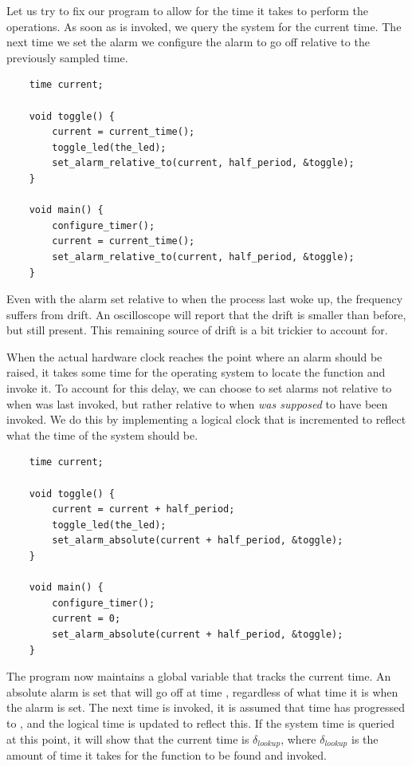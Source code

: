 Let us try to fix our program to allow for the time it takes to perform the operations.
As soon as  is invoked, we query the system for the current time. The next time we set
the alarm we configure the alarm to go off relative to the previously sampled time.

\begin{verbatim}
    time current;

    void toggle() {
        current = current_time();
        toggle_led(the_led);
        set_alarm_relative_to(current, half_period, &toggle);
    }

    void main() {
        configure_timer();
        current = current_time();
        set_alarm_relative_to(current, half_period, &toggle);
    }
\end{verbatim}

Even with the alarm set relative to when the process last woke up, the frequency suffers from drift. An oscilloscope
will report that the drift is smaller than before, but still present. This remaining source of drift is a bit
trickier to account for.

When the actual hardware clock reaches the point where an alarm should be raised, it takes some time for the
operating system to locate the  function and invoke it. To account for this delay, we can choose to
set alarms not relative to when  was last invoked, but rather relative to when 
\textit{was supposed} to have been invoked. We do this by implementing a logical clock that is incremented to reflect
what the time of the system should be.

\begin{verbatim}
    time current;

    void toggle() {
        current = current + half_period;
        toggle_led(the_led);
        set_alarm_absolute(current + half_period, &toggle);
    }

    void main() {
        configure_timer();
        current = 0;
        set_alarm_absolute(current + half_period, &toggle);
    }
\end{verbatim}

The program now maintains a global variable that tracks the current time. An absolute alarm is set that will go off at
time , regardless of what time it is when the alarm is set. The next time 
is invoked, it is assumed that time has progressed to , and the logical time is updated
to reflect this. If the system time is queried at this point, it will show that the current time is 
 $\delta_{lookup}$, where $\delta_{lookup}$ is the amount of time it takes for the
 function to be found and invoked.

